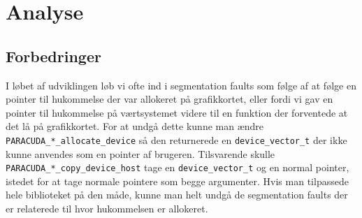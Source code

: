 

\section{Analyse}

\subsection{Forbedringer}

I løbet af udviklingen løb vi ofte ind i segmentation faults som følge af at
følge en pointer til hukommelse der var allokeret på grafikkortet, eller
fordi vi gav en pointer til hukommelse på værtsystemet videre til en
funktion der forventede at det lå på grafikkortet.
For at undgå dette kunne man ændre \verb|PARACUDA_*_allocate_device|
så den returnerede en \verb|device_vector_t| der ikke kunne anvendes som en
pointer af brugeren. Tilsvarende skulle \verb|PARACUDA_*_copy_device_host|
tage en \verb|device_vector_t| og en normal pointer, istedet for at tage
normale pointere som begge argumenter. Hvis man tilpassede hele biblioteket
på den måde, kunne man helt undgå de segmentation faults der er relaterede 
til hvor hukommelsen er allokeret.

